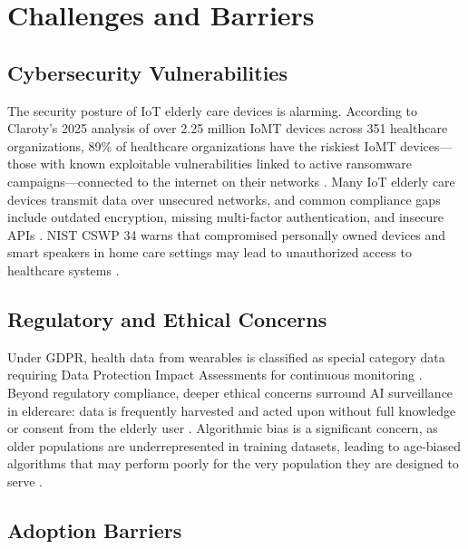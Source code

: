 \documentclass[conference]{IEEEtran}
\begin{document}
\section{Challenges and Barriers}

\subsection{Cybersecurity Vulnerabilities}

The security posture of IoT elderly care devices is alarming. According to Claroty's 2025 analysis of over 2.25 million IoMT devices across 351 healthcare organizations, 89\% of healthcare organizations have the riskiest IoMT devices---those with known exploitable vulnerabilities linked to active ransomware campaigns---connected to the internet on their networks \cite{helpnet_cyber}. Many IoT elderly care devices transmit data over unsecured networks, and common compliance gaps include outdated encryption, missing multi-factor authentication, and insecure APIs \cite{hipaa_iot}. NIST CSWP 34 warns that compromised personally owned devices and smart speakers in home care settings may lead to unauthorized access to healthcare systems \cite{nist_cswp34}.

\subsection{Regulatory and Ethical Concerns}

Under GDPR, health data from wearables is classified as special category data requiring Data Protection Impact Assessments for continuous monitoring \cite{censinet_gdpr}. Beyond regulatory compliance, deeper ethical concerns surround AI surveillance in eldercare: data is frequently harvested and acted upon without full knowledge or consent from the elderly user \cite{frontiers_dignity}. Algorithmic bias is a significant concern, as older populations are underrepresented in training datasets, leading to age-biased algorithms that may perform poorly for the very population they are designed to serve \cite{frontiers_ageism}.

\subsection{Adoption Barriers}
\end{document}

